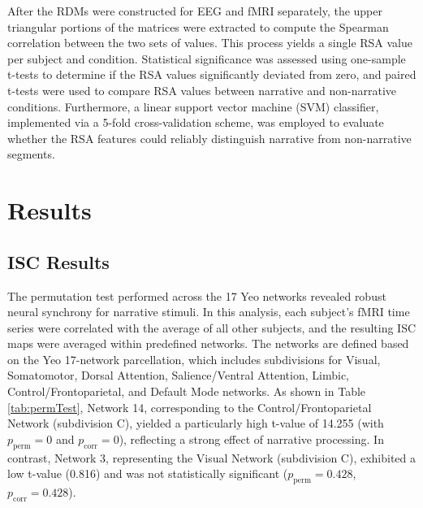 \documentclass[stu,12pt,floatsintext]{apa7}
\begin{document}
After the RDMs were constructed for EEG and fMRI separately, the upper triangular portions of the matrices were extracted to compute the Spearman correlation between the two sets of values. This process yields a single RSA value per subject and condition. Statistical significance was assessed using one-sample t-tests to determine if the RSA values significantly deviated from zero, and paired t-tests were used to compare RSA values between narrative and non-narrative conditions. Furthermore, a linear support vector machine (SVM) classifier, implemented via a 5-fold cross-validation scheme, was employed to evaluate whether the RSA features could reliably distinguish narrative from non-narrative segments.

\section{Results}

\subsection{ISC Results}
The permutation test performed across the 17 Yeo networks revealed robust neural synchrony for narrative stimuli. In this analysis, each subject's fMRI time series were correlated with the average of all other subjects, and the resulting ISC maps were averaged within predefined networks. The networks are defined based on the Yeo 17-network parcellation, which includes subdivisions for Visual, Somatomotor, Dorsal Attention, Salience/Ventral Attention, Limbic, Control/Frontoparietal, and Default Mode networks. As shown in Table \ref{tab:permTest}, Network 14,  corresponding to the Control/Frontoparietal Network (subdivision C), yielded a particularly high t-value of 14.255 (with $p_{\text{perm}}=0$ and $p_{\text{corr}}=0$), reflecting a strong effect of narrative processing. In contrast, Network 3, representing the Visual Network (subdivision C), exhibited a low t-value (0.816) and was not statistically significant ($p_{\text{perm}}=0.428$, $p_{\text{corr}}=0.428$).
\end{document}

